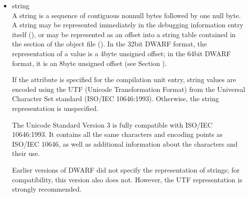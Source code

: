 \begin{itemize}
The third type of reference can identify any debugging
information type entry that has been placed in its own
type unit. This type of 
reference () is the
64\dash bit type signature 
(see Section ) 
that was computed
for the type.

The use of compilation unit relative references will reduce the
number of link\dash time relocations and so speed up linking. The
use of the second and third type of reference allows for the
sharing of information, such as types, across compilation
units.

A reference to any kind of compilation unit identifies the
debugging information entry for that unit, not the preceding
header.

\item string \\
A string is a sequence of contiguous non\dash null bytes followed by
one null byte. A string may be represented immediately in the
debugging information entry itself 
(), or may
be represented as an offset into a string table contained in
the  section of the object file 
(). In
the 32\dash bit DWARF format, the representation of a 
value is a 4\dash byte unsigned offset; in the 64\dash bit DWARF format,
it is an 8\dash byte unsigned offset 
(see Section ).

If the  attribute is specified for the
compilation unit entry, string values are encoded using the
UTF (Unicode Transformation Format) from the Universal
Character Set standard (ISO/IEC 10646:1993). Otherwise,
the string representation is unspecified.

The Unicode Standard Version 3 is fully compatible with
ISO/IEC 10646:1993. It contains all the same characters
and encoding points as ISO/IEC 10646, as well as additional
information about the characters and their use.

Earlier versions of DWARF did not specify the representation
of strings; for compatibility, this version also does
not. However, the UTF representation is strongly recommended.

\end{itemize}

